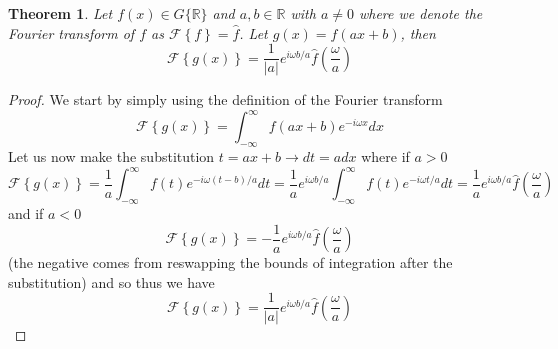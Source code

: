 \documentclass{report}
\newtheorem{theorem}{Theorem}[chapter]
\theoremstyle{definition}
\theoremstyle{remark}
\newcommand{\ft}[1]{\mathscr{F}\left\{ #1\right\}}
\newcommand{\R}{\mathbb{R}}
\begin{document}
\begin{theorem}
    Let $f(x)\in G\{\R\}$ and $a,b \in \R$ with $a\neq 0$ where we denote the Fourier transform of $f$ as $\ft{f}=\hat f$. Let $g(x)=f(ax+b)$, then \label{theo:6.4}
    \begin{equation*}
        \ft{g(x)} = \frac{1}{|a|}e^{i\omega b/a}\hat{f}\left( \frac{\omega}{a}\right)
    \end{equation*}
\end{theorem}
\begin{proof}
    We start by simply using the definition of the Fourier transform 
    \begin{equation*}
        \ft{g(x)} = \int^\infty_{-\infty}f(ax+b)e^{-i\omega x}dx
    \end{equation*}
    Let us now make the substitution $t=ax+b\rightarrow dt=adx$ where if $a>0$
    \begin{equation*}
        \ft{g(x)} = \frac{1}{a}\int^\infty_{-\infty}f(t)e^{-i\omega(t-b)/a}dt = \frac{1}{a}e^{i\omega b/a}\int^\infty_{-\infty}f(t)e^{-i\omega t/a}dt =\frac{1}{a}e^{i\omega b/a}\hat f\left(\frac{\omega}{a}\right)
    \end{equation*}
    and if $a<0$
    \begin{equation*}
        \ft{g(x)} = -\frac{1}{a}e^{i\omega b/a}\hat f\left(\frac{\omega}{a}\right)
    \end{equation*}
    (the negative comes from reswapping the bounds of integration after the substitution) and so thus we have 
    \begin{equation*}
        \ft{g(x)} = \frac{1}{|a|}e^{i\omega b/a}\hat{f}\left( \frac{\omega}{a}\right)
    \end{equation*}
\end{proof}
\end{document}
